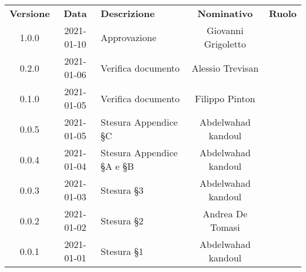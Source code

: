 {
    \renewcommand{\arraystretch}{1.5}
    \centering
    \begin{longtable}{ c c  C{4cm}  c  c }
        \rowcolor{\primaryColor}
        \textcolor{\secondaryColor}{
        \textbf{Versione}}     & \textcolor{\secondaryColor}{\textbf{Data}}       & \textcolor{\secondaryColor}
        {\textbf{Descrizione}} & \textcolor{\secondaryColor}{\textbf{Nominativo}} & \textcolor{\secondaryColor}{\textbf{Ruolo}}                          \\


        1.0.0                   &2021-01-10                                        & Approvazione                                   &Giovanni Grigoletto & \responsabile{}\\
        0.2.0                  & 2021-01-06                                       & Verifica documento                            &Alessio Trevisan &\verificatore{}\\
        0.1.0                  & 2021-01-05                                       & Verifica documento                            &Filippo Pinton &\verificatore{}\\
        0.0.5                  & 2021-01-05                                       & Stesura Appendice §C                         & Abdelwahad kandoul & \redattore{} \\
        0.0.4                  & 2021-01-04                                       & Stesura Appendice §A e §B                          & Abdelwahad kandoul & \redattore{} \\
        0.0.3                  & 2021-01-03                                       & Stesura §3                            & Abdelwahad kandoul & \redattore{} \\
        0.0.2                  & 2021-01-02                                       & Stesura §2                              & Andrea De Tomasi & \redattore{} \\
        0.0.1                  & 2021-01-01                                       & Stesura §1                            & Abdelwahad kandoul & \redattore{} \\
    
    
    \end{longtable}
}